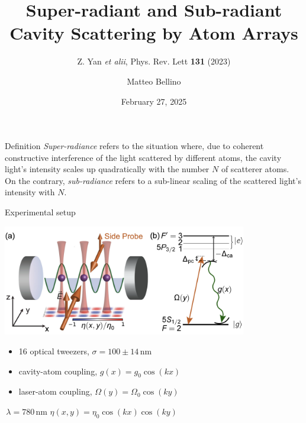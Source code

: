 \documentclass{beamer}
\author{Matteo Bellino}
\title{Super-radiant and Sub-radiant Cavity Scattering by Atom Arrays}
\subtitle{Z. Yan \textit{et alii}, Phys. Rev. Lett \textbf{131} (2023)}
\date{February 27, 2025}
\begin{document}
\frame{\maketitle}
\begin{frame}{Definition}
	\alert{\textit{Super-radiance}} refers to the situation where, due to coherent constructive interference of the light scattered by different atoms, the cavity light's intensity scales up quadratically with the number $N$ of scatterer atoms.\newline
	~\newline
	On the contrary, \alert{\textit{sub-radiance}} refers to a sub-linear scaling of the scattered light's intensity with $N$.
\end{frame}

\begin{frame}{Experimental setup}
	\begin{minipage}{\textwidth}
		\centering
		\includegraphics[width=0.8\textwidth]{Figure_1.png}
		\hspace{3em}
	\end{minipage}\newline
	\vspace{2em}
	\begin{minipage}{\textwidth}
		\begin{minipage}{0.57\textwidth}
			\begin{itemize}
				\item {\small 16 optical tweezers, $\sigma = 100\pm14\,$nm}
				\item {\small cavity-atom coupling, $g(x)=g_0\cos(kx)$}
				\item {\small laser-atom coupling, $\Omega(y)=\Omega_0\cos(ky)$}
			\end{itemize}
		\end{minipage}
		\begin{minipage}{0.42\textwidth}
			\centering
			$\,\lambda=780\,$nm\newline
			\alert{$\eta(x,y)=\eta_0\cos(kx)\cos(ky)$}
		\end{minipage}
	\end{minipage}
\end{frame}
\end{document}

